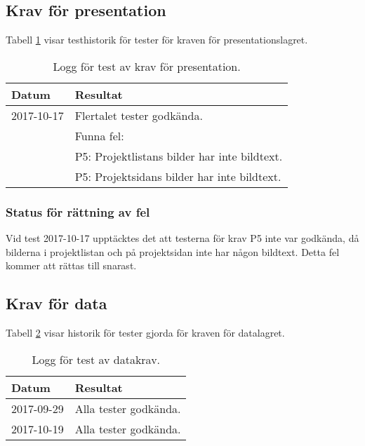 \documentclass{TDP003mall}
\begin{document}
\subsection{Krav för presentation}
Tabell \ref{table:presentationskravlogg} visar testhistorik för tester för kraven för presentationslagret.

  {\renewcommand{\arraystretch}{1.2}
  \begin{table}[!h]
    
    \begin{tabularx}{\linewidth}{|l|X|}
      \hline
      Datum & Resultat\\
      \hline
      2017-10-17 & Flertalet tester godkända.\\
      & Funna fel: \\
      & P5: Projektlistans bilder har inte bildtext. \\
      & P5: Projektsidans bilder har inte bildtext. \\
      \hline
    \end{tabularx}
    \caption{Logg för test av krav för presentation.}
    \label{table:presentationskravlogg}
  \end{table}
  }

  \subsubsection{Status för rättning av fel}
  Vid test 2017-10-17 upptäcktes det att testerna för krav P5 inte var godkända, då bilderna i projektlistan och på projektsidan inte har någon bildtext. Detta fel kommer att rättas till snarast. 

\subsection{Krav för data}
Tabell \ref{table:datakravlogg} visar historik för tester gjorda för kraven för datalagret.

  {\renewcommand{\arraystretch}{1.2}
  \begin{table}[!h]
    
    \begin{tabularx}{\linewidth}{|l|X|}
      \hline
      Datum & Resultat\\
      \hline
      2017-09-29 & Alla tester godkända. \\
      \hline
      2017-10-19 & Alla tester godkända. \\
      \hline
    \end{tabularx}
    \caption{Logg för test av datakrav.}
    \label{table:datakravlogg}
  \end{table}
  }   
\end{document}
